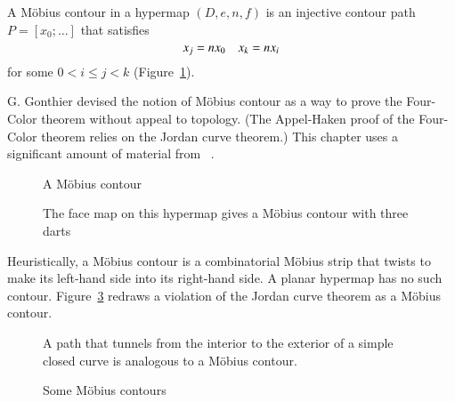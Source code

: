 \begin{definition} A M\"obius contour in a hypermap
$(D,e,n,f)$ is an
injective contour path $P=[x_0;\ldots]$ that satisfies
\begin{equation}
\tlabel{eqn:mobius}
x_j = n x_0\quad x_k = n x_i
\end{equation}
for some $0 < i\le j< k$ (Figure~\ref{fig:mobius}).
%
\end{definition}


\begin{remark}
G. Gonthier devised the notion of M\"obius contour as a way to prove
the Four-Color theorem without appeal to topology.  (The Appel-Haken
proof of the Four-Color theorem relies on the Jordan curve theorem.)
This chapter uses a significant amount of material from ~\cite{Gonthier:2005:FourColor}.
\end{remark}

\begin{figure}[htb]
\centering
{}
\caption{A M\"obius contour}
\label{fig:mobius}
\end{figure}

\begin{figure}[htb]
\centering
{}
\caption{The face map on this hypermap gives a M\"obius contour with
three darts}
\label{fig:3m}
\end{figure}

\begin{remark} Heuristically, a M\"obius contour is a 
combinatorial M\"obius strip that
twists to make 
its left-hand side into
its right-hand side.  A planar hypermap has no such contour.  
Figure~\ref{fig:violate-jct}
redraws a violation of the Jordan curve theorem
as a M\"obius contour.   
\end{remark}

\begin{figure}[htb]
\centering
{}
\caption{A path that tunnels from the interior to the exterior
of a simple closed curve
is analogous to a M\"obius contour.}
\label{fig:violate-jct}
\end{figure}

\begin{figure}[htb]
\centering
{}
\caption{Some M\"obius contours}
\label{fig:mobius-contour}
\end{figure}






